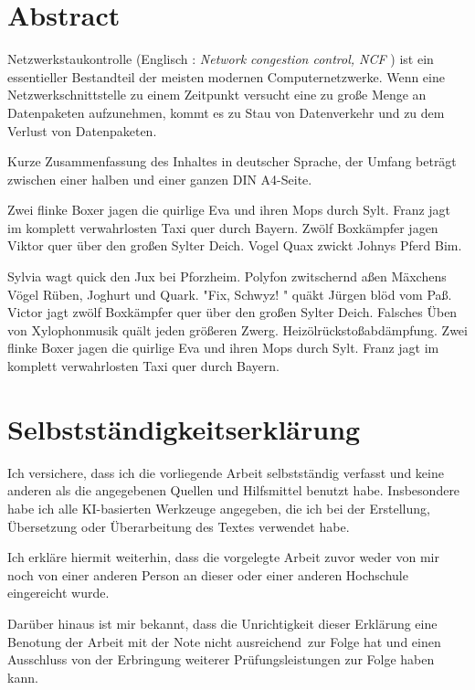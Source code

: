 \documentclass[paper=a4,fontsize=12pt,ngerman]{scrartcl}
\begin{document}
\pagestyle{plain}



\section*{Abstract}

Netzwerkstaukontrolle (Englisch : \textit{ Network congestion control, NCF }) ist ein essentieller Bestandteil der 
meisten modernen Computernetzwerke.
Wenn eine Netzwerkschnittstelle zu einem Zeitpunkt versucht eine zu große Menge an Datenpaketen aufzunehmen, 
kommt es zu Stau von Datenverkehr und zu dem Verlust von Datenpaketen.

\;
\;
\;

Kurze Zusammenfassung des Inhaltes in deutscher Sprache, der Umfang beträgt 
zwischen einer halben und einer ganzen DIN A4-Seite.

Zwei flinke Boxer jagen die quirlige Eva und ihren Mops durch Sylt. Franz 
jagt im komplett verwahrlosten Taxi quer durch Bayern. Zwölf Boxkämpfer jagen 
Viktor quer über den großen Sylter Deich. Vogel Quax zwickt Johnys Pferd Bim.

Sylvia wagt quick den Jux bei Pforzheim. Polyfon zwitschernd aßen Mäxchens 
Vögel Rüben, Joghurt und Quark. "Fix, Schwyz! " quäkt Jürgen blöd vom Paß. 
Victor jagt zwölf Boxkämpfer quer über den großen Sylter Deich. Falsches Üben 
von Xylophonmusik quält jeden größeren Zwerg. Heizölrückstoßabdämpfung. Zwei 
flinke Boxer jagen die quirlige Eva und ihren Mops durch Sylt. Franz jagt im 
komplett verwahrlosten Taxi quer durch Bayern.


\newpage
\section*{Selbstständigkeitserklärung}
Ich versichere, dass ich die vorliegende Arbeit selbstständig verfasst und 
keine anderen als die angegebenen Quellen und Hilfsmittel benutzt habe.
Insbesondere habe ich alle KI-basierten Werkzeuge angegeben, die ich bei
der Erstellung, Übersetzung oder Überarbeitung des Textes verwendet habe.

Ich erkläre hiermit weiterhin, dass die vorgelegte Arbeit zuvor weder von mir 
noch von einer anderen Person an dieser oder einer anderen Hochschule 
eingereicht wurde.

Darüber hinaus ist mir bekannt, dass die Unrichtigkeit dieser Erklärung eine 
Benotung der Arbeit mit der Note \glqq nicht ausreichend\grqq \ zur Folge hat 
und einen Ausschluss von der Erbringung weiterer Prüfungsleistungen zur Folge 
haben kann.
\bigskip
 
\end{document}
